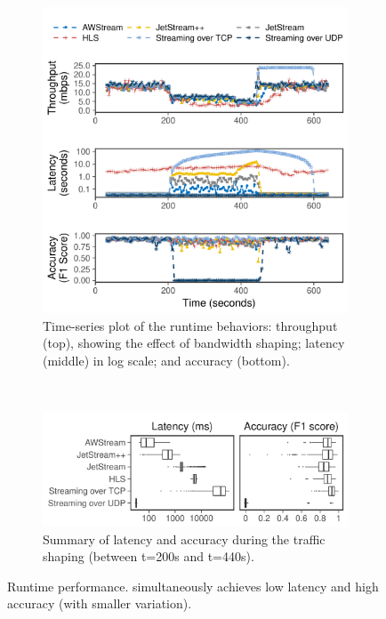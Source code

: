 \begin{figure}[t]
  \begin{subfigure}[t]{\columnwidth}
    \centering
    \includegraphics[width=\columnwidth]{figures/runtime_darknet-timeseries.pdf}
    \caption{Time-series plot of the runtime behaviors: throughput (top),
      showing the effect of bandwidth shaping; latency (middle) in log scale;
      and accuracy (bottom).}
    \label{fig:ar-runtime-timeseries}
  \end{subfigure}
  \vspace{1em}
  \\
  \begin{subfigure}[t]{\columnwidth}
    \centering
    \includegraphics[width=\columnwidth]{figures/runtime_darknet-boxplot.pdf}
    \caption{Summary of latency and accuracy during the traffic shaping (between
      t=200s and t=440s). }
    \label{fig:ar-runtime-boxplot}
  \end{subfigure}
  \caption{Runtime performance. \sysname{} simultaneously achieves low latency
    and high accuracy (with smaller variation). }
  \label{fig:ar-runtime}
\end{figure}

